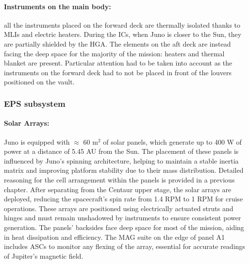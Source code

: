 \paragraph{Instruments on the main body:} all the instruments placed on the forward deck are thermally isolated thanks to MLIs and electric heaters. During the ICs, when Juno is closer to the Sun, they are partially shielded by the HGA.\cite{JADE_info}\cite{JEDI_info} The elements on the aft deck are instead facing the deep space for the majority of the mission: heaters and thermal blanket are present.\cite{Waves_info} Particular attention had to be taken into account as the instruments on the forward deck had to not be placed in front of the louvers positioned on the vault. 

\subsubsection{EPS subsystem}
\label{subsubsec:eps_sub}

\vspace{-2mm}

\paragraph{Solar Arrays:} Juno is equipped with $\approx$ 60 m$^2$ of solar panels, which generate up to 400 W of power at a distance of 5.45 AU from the Sun.\cite{pannelli} The placement of these panels is influenced by Juno's spinning architecture, helping to maintain a stable inertia matrix and improving platform stability due to their mass distribution.\cite{solar_panels_coef} Detailed reasoning for the cell arrangement within the panels is provided in a previous chapter. After separating from the Centaur upper stage, the solar arrays are deployed, reducing the spacecraft's spin rate from 1.4 RPM to 1 RPM for cruise operations.\cite{Juno_launch} These arrays are positioned using electrically actuated struts and hinges and must remain unshadowed by instruments to ensure consistent power generation. The panels' backsides face deep space for most of the mission, aiding in heat dissipation and efficiency. The MAG suite on the edge of panel A1 includes ASCs to monitor any flexing of the array, essential for accurate readings of Jupiter's magnetic field. 

\vspace{-4mm}

